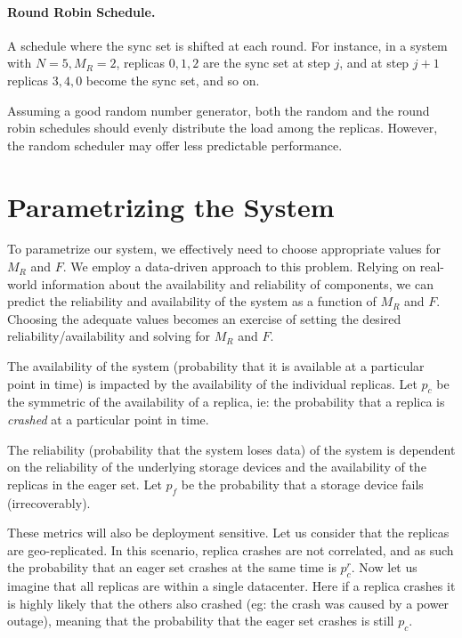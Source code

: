 \paragraph{Round Robin Schedule.} A schedule where the sync set
is shifted at each round. For instance, in a system with $N = 5,
M_R = 2$, replicas $0, 1, 2$ are the sync set at step $j$, and
at step $j + 1$ replicas $3, 4, 0$ become the sync set, and so
on.

Assuming a good random number generator, both the random and the
round robin schedules should evenly distribute the load among the
replicas. However, the random scheduler may offer less
predictable performance.

\section{Parametrizing the System}\label{sec:r2s2parametrization}

To parametrize our system, we effectively need to choose
appropriate values for $M_R$ and $F$. We employ a data-driven
approach to this problem. Relying on real-world information about
the availability and reliability of components, we can predict
the reliability and availability of the system as a function of
$M_R$ and $F$. Choosing the adequate values becomes an exercise of
setting the desired reliability/availability and solving for $M_R$
and $F$.

The availability of the system (probability that it is available
at a particular point in time) is impacted by the availability of
the individual replicas. Let $p_c$ be the symmetric of the
availability of a replica, ie: the probability that a replica is
\emph{crashed} at a particular point in time.

The reliability (probability that the system loses data) of the
system is dependent on the reliability of the underlying storage
devices and the availability of the replicas in the eager set.
Let $p_f$ be the probability that a storage device fails
(irrecoverably).

These metrics will also be deployment sensitive. Let us consider
that the replicas are geo-replicated. In this scenario, replica
crashes are not correlated, and as such the probability that an
eager set crashes at the same time is $p_c^r$. Now let us imagine
that all replicas are within a single datacenter. Here if a
replica crashes it is highly likely that the others also crashed
(eg: the crash was caused by a power outage), meaning that the
probability that the eager set crashes is still $p_c$.

